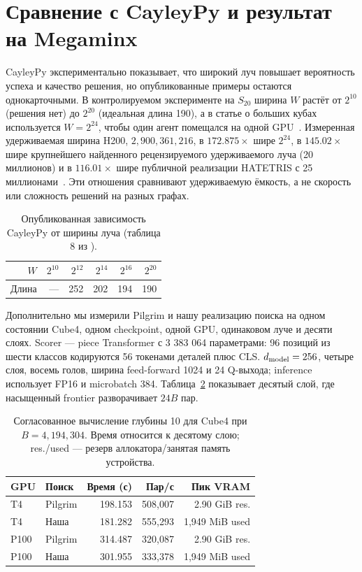 \documentclass[10pt,twocolumn]{article}
\begin{document}
\section{Сравнение с CayleyPy и результат на Megaminx}
CayleyPy экспериментально показывает, что широкий луч повышает вероятность
успеха и качество решения, но опубликованные примеры остаются однокарточными.
В контролируемом эксперименте на $S_{20}$ ширина $W$ растёт от $2^{10}$
(решения нет) до $2^{20}$ (идеальная длина 190), а в статье о больших кубах
используется $W=2^{24}$, чтобы один агент помещался на одной
GPU~\cite{soibelman2025cayleypy,chervov2025large}. Измеренная удерживаемая
ширина H200, $2{,}900{,}361{,}216$, в $172.875\times$ шире $2^{24}$, в
$145.02\times$ шире крупнейшего найденного рецензируемого удерживаемого луча
(20 миллионов) и в $116.01\times$ шире публичной реализации HATETRIS с 25
миллионами~\cite{hatetrispublic}. Эти отношения сравнивают удерживаемую
ёмкость, а не скорость или сложность решений на разных графах.

\begin{table}[t]
\centering
\small
\caption{Опубликованная зависимость CayleyPy от ширины луча (таблица 8 из
\cite{soibelman2025cayleypy}).}
\label{tab:cayleypy_width}
\begin{tabular}{@{}rrrrrr@{}}
\toprule
$W$ & $2^{10}$ & $2^{12}$ & $2^{14}$ & $2^{16}$ & $2^{20}$ \\
\midrule
Длина & --- & 252 & 202 & 194 & 190 \\
\bottomrule
\end{tabular}
\end{table}

Дополнительно мы измерили Pilgrim и нашу реализацию поиска на одном
состоянии Cube4, одном checkpoint, одной GPU, одинаковом луче и десяти слоях.
Scorer --- piece Transformer с 3 383 064 параметрами: 96 позиций из шести
классов кодируются 56 токенами деталей плюс CLS. $d_{\rm model}=256$,
четыре слоя, восемь голов, ширина feed-forward 1024 и 24 Q-выхода;
inference использует FP16 и microbatch 384.
Таблица~\ref{tab:cube4_pair} показывает десятый слой, где насыщенный frontier
разворачивает $24B$ пар.

\begin{table}[t]
\centering
\small
\setlength{\tabcolsep}{2pt}
\caption{Согласованное вычисление глубины 10 для Cube4 при $B=4{,}194{,}304$.
Время относится к десятому слою; res./used --- резерв аллокатора/занятая память устройства.}
\label{tab:cube4_pair}
\begin{tabular}{@{}llrrr@{}}
\toprule
GPU & Поиск & Время (с) & Пар/с & Пик VRAM \\
\midrule
T4 & Pilgrim & 198.153 & 508,007 & 2.90 GiB res. \\
T4 & Наша & 181.282 & 555,293 & 1,949 MiB used \\
P100 & Pilgrim & 314.487 & 320,087 & 2.90 GiB res. \\
P100 & Наша & 301.955 & 333,378 & 1,949 MiB used \\
\bottomrule
\end{tabular}
\end{table}
\end{document}
